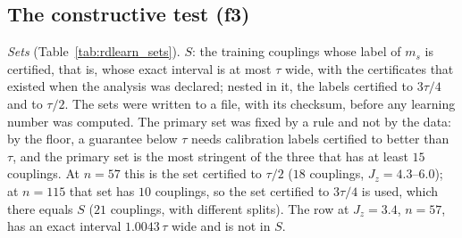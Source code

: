 \documentclass[aps,prx,onecolumn,10pt,nofootinbib,longbibliography,floatfix]{revtex4-2}
\theoremstyle{remark}
\newcommand{\Jz}{J_z}
\newcommand{\ms}{m_s}
\begin{document}
\subsection{The constructive test (f3)}

\emph{Sets} (Table~\ref{tab:rdlearn_sets}). $S$: the training couplings whose label of $\ms$ is certified, that is,
whose exact interval is at most $\tau$ wide, with the certificates that existed when the analysis was declared;
nested in it, the labels certified to $3\tau/4$ and to $\tau/2$. The sets were written to a file, with its
checksum, before any learning number was computed. The primary set was fixed by a rule and not by the data: by the
floor, a guarantee below $\tau$ needs calibration labels certified to better than $\tau$, and the primary set is
the most stringent of the three that has at least $15$ couplings. At $n=57$ this is the set certified to $\tau/2$ %
($18$ couplings, $\Jz=4.3$--$6.0$); at $n=115$ that set has $10$ couplings, so the set certified to $3\tau/4$ is %
used, which there equals $S$ ($21$ couplings, with different splits). The row at $\Jz=3.4$, $n=57$, has an exact %
interval $1.0043\,\tau$ wide and is not in $S$. %

\def\SMcap{The nested sets of certified public labels of $\ms$ used by the constructive test: the labels whose
exact interval is at most $\tau$, $3\tau/4$ or $\tau/2$ wide. ``Declared'': with the certificates that existed when
the analysis was declared; ``extended'': with those computed afterwards as well (secondary; at $n=57$ the three %
sets do not change). Width of the exact intervals of the set, greatest miss of a public label of the set, and
change of the true $\ms$ over the set, in units of $\tau$ (ranges rounded outward; the change is divided by the
greatest and by the smallest tolerance of the set).}\def\SMlab{tab:rdlearn_sets}

\end{document}
